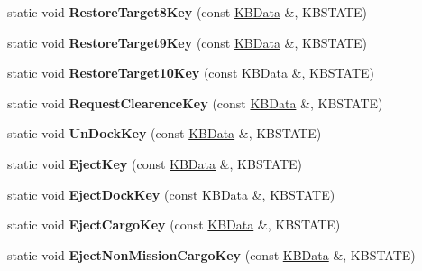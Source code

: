 \begin{DoxyCompactItemize}
\item 
static void {\bfseries Restore\+Target8\+Key} (const \hyperlink{classKBData}{K\+B\+Data} \&, K\+B\+S\+T\+A\+TE)\hypertarget{classFireKeyboard_acd5972886340b24a0065a49a52c78c25}{}\label{classFireKeyboard_acd5972886340b24a0065a49a52c78c25}

\item 
static void {\bfseries Restore\+Target9\+Key} (const \hyperlink{classKBData}{K\+B\+Data} \&, K\+B\+S\+T\+A\+TE)\hypertarget{classFireKeyboard_a4735aa28f304360d980df4d07c0da170}{}\label{classFireKeyboard_a4735aa28f304360d980df4d07c0da170}

\item 
static void {\bfseries Restore\+Target10\+Key} (const \hyperlink{classKBData}{K\+B\+Data} \&, K\+B\+S\+T\+A\+TE)\hypertarget{classFireKeyboard_a1951c2b6734f828c55ef55e65a2ad889}{}\label{classFireKeyboard_a1951c2b6734f828c55ef55e65a2ad889}

\item 
static void {\bfseries Request\+Clearence\+Key} (const \hyperlink{classKBData}{K\+B\+Data} \&, K\+B\+S\+T\+A\+TE)\hypertarget{classFireKeyboard_a8d403a6a2a1e7666f2c432bce8e01f3c}{}\label{classFireKeyboard_a8d403a6a2a1e7666f2c432bce8e01f3c}

\item 
static void {\bfseries Un\+Dock\+Key} (const \hyperlink{classKBData}{K\+B\+Data} \&, K\+B\+S\+T\+A\+TE)\hypertarget{classFireKeyboard_a2b7f21b1c6f8258425c2394dbab45c34}{}\label{classFireKeyboard_a2b7f21b1c6f8258425c2394dbab45c34}

\item 
static void {\bfseries Eject\+Key} (const \hyperlink{classKBData}{K\+B\+Data} \&, K\+B\+S\+T\+A\+TE)\hypertarget{classFireKeyboard_a03e10062b6e09cbbee3f2bcae25f972f}{}\label{classFireKeyboard_a03e10062b6e09cbbee3f2bcae25f972f}

\item 
static void {\bfseries Eject\+Dock\+Key} (const \hyperlink{classKBData}{K\+B\+Data} \&, K\+B\+S\+T\+A\+TE)\hypertarget{classFireKeyboard_ae993dddb285abc00f57b39dc2fc48212}{}\label{classFireKeyboard_ae993dddb285abc00f57b39dc2fc48212}

\item 
static void {\bfseries Eject\+Cargo\+Key} (const \hyperlink{classKBData}{K\+B\+Data} \&, K\+B\+S\+T\+A\+TE)\hypertarget{classFireKeyboard_af7b33f7aff60a65be246fc56c54a40e9}{}\label{classFireKeyboard_af7b33f7aff60a65be246fc56c54a40e9}

\item 
static void {\bfseries Eject\+Non\+Mission\+Cargo\+Key} (const \hyperlink{classKBData}{K\+B\+Data} \&, K\+B\+S\+T\+A\+TE)\hypertarget{classFireKeyboard_a88b414f8c5a9b4b658de442f505c62dd}{}\label{classFireKeyboard_a88b414f8c5a9b4b658de442f505c62dd}


\end{DoxyCompactItemize}
